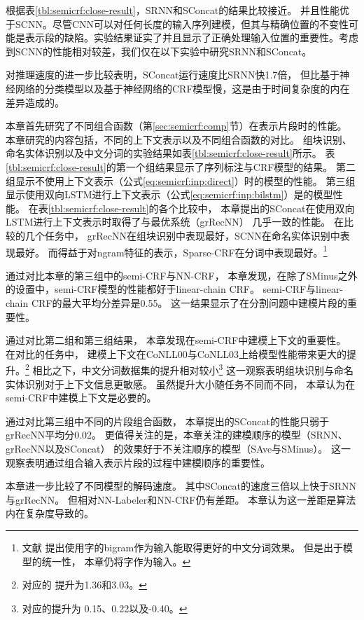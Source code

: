 根据表\ref{tbl:semicrf:close-result}，SRNN和SConcat的结果比较接近。
并且性能优于SCNN。尽管CNN可以对任何长度的输入序列建模，但其与精确位置的不变性可能是表示段的缺陷。实验结果证实了并且显示了正确处理输入位置的重要性。考虑到SCNN的性能相对较差，我们仅在以下实验中研究SRNN和SConcat。

对推理速度的进一步比较表明，SConcat运行速度比SRNN快1.7倍，
但比基于神经网络的分类模型以及基于神经网络的CRF模型慢，这是由于时间复杂度的内在差异造成的。

本章首先研究了不同组合函数（第\ref{sec:semicrf:comp}节）在表示片段时的性能。
本章研究的内容包括，不同的上下文表示以及不同组合函数的对比。
组块识别、命名实体识别以及中文分词的实验结果如表\ref{tbl:semicrf:close-result}所示。
表\ref{tbl:semicrf:close-result}的第一个组结果显示了序列标注与CRF模型的结果。
第二组显示不使用上下文表示（公式\ref{eq:semicrf:inp:direct}）时的模型的性能。
第三组显示使用双向LSTM进行上下文表示（公式\ref{eq:semicrf:inp:bilstm}）是的模型性能。
在表\ref{tbl:semicrf:close-result}的各个比较中，
本章提出的SConcat在使用双向LSTM进行上下文表示时取得了与最优系统（grRecNN）
几乎一致的性能。
在比较的几个任务中，
grRecNN在组块识别中表现最好，SCNN在命名实体识别中表现最好。
而得益于对ngram特征的表示，Sparse-CRF在分词中表现最好。\footnote{文献
	提出使用字的bigram作为输入能取得更好的中文分词效果。
	但是出于模型的统一性，
	本章仍将字作为输入。}

通过对比本章的第三组中的semi-CRF与NN-CRF，
本章发现，在除了SMinus之外的设置中，semi-CRF模型的性能都好于linear-chain CRF。
semi-CRF与linear-chain CRF的最大平均分差异是0.55。
这一结果显示了在分割问题中建模片段的重要性。

通过对比第二组和第三组结果，
本章发现在semi-CRF中建模上下文的重要性。
在对比的任务中，
建模上下文在CoNLL00与CoNLL03上给模型性能带来更大的提升。\footnote{对应的
	提升为1.36和3.03。
}
相比之下，中文分词数据集的提升相对较小\footnote{对应的提升为
	0.15、0.22以及-0.40。}
这一观察表明组块识别与命名实体识别对于上下文信息更敏感。
虽然提升大小随任务不同而不同，
本章认为在semi-CRF中建模上下文是必要的。

通过对比第三组中不同的片段组合函数，
本章提出的SConcat的性能只弱于grRecNN平均分0.02。
更值得关注的是，本章关注的建模顺序的模型（SRNN、grRecNN以及SConcat）
的效果好于不关注顺序的模型（SAve与SMinus）。
这一观察表明通过组合输入表示片段的过程中建模顺序的重要性。

本章进一步比较了不同模型的解码速度。
其中SConcat的速度三倍以上快于SRNN与grRecNN。
但相对NN-Labeler和NN-CRF仍有差距。
本章认为这一差距是算法内在复杂度导致的。

